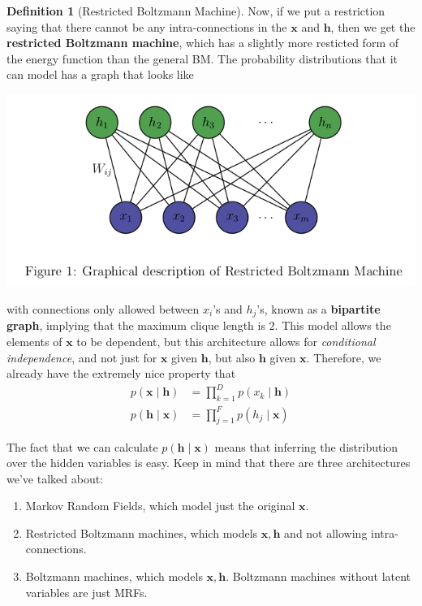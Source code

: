 \documentclass{article}
\theoremstyle{definition}
\theoremstyle{remark}
\theoremstyle{definition}
\newtheorem{definition}{Definition}[section]
\begin{document}
\begin{definition}[Restricted Boltzmann Machine] 
    Now, if we put a restriction saying that there cannot be any intra-connections in the $\mathbf{x}$ and $\mathbf{h}$, then we get the \textbf{restricted Boltzmann machine}, which has a slightly more resticted form of the energy function than the general BM. The probability distributions that it can model has a graph that looks like 
\begin{center}
    \includegraphics[scale=0.4]{Images/rbm_layer.png}
\end{center}
with connections only allowed between $x_i$'s and $h_j$'s, known as a \textbf{bipartite graph}, implying that the maximum clique length is $2$. This model allows the elements of $\mathbf{x}$ to be dependent, but this architecture allows for \textit{conditional independence}, and not just for $\mathbf{x}$ given $\mathbf{h}$, but also $\mathbf{h}$ given $\mathbf{x}$. Therefore, we already have the extremely nice property that 
\begin{align*} 
    p(\mathbf{x} \mid \mathbf{h}) & = \prod_{k=1}^{D} p(x_k \mid \mathbf{h}) \\
    p(\mathbf{h} \mid \mathbf{x}) & = \prod_{j=1}^F p(h_j \mid \mathbf{x}) 
\end{align*}
\end{definition}

The fact that we can calculate $p(\mathbf{h} \mid \mathbf{x})$ means that inferring the distribution over the hidden variables is easy. Keep in mind that there are three architectures we've talked about: 
\begin{enumerate}
    \item Markov Random Fields, which model just the original $\mathbf{x}$. 
    \item Restricted Boltzmann machines, which models $\mathbf{x}, \mathbf{h}$ and not allowing intra-connections. 
    \item Boltzmann machines, which models $\mathbf{x}, \mathbf{h}$. Boltzmann machines without latent variables are just MRFs.  
\end{enumerate}
\end{document}
